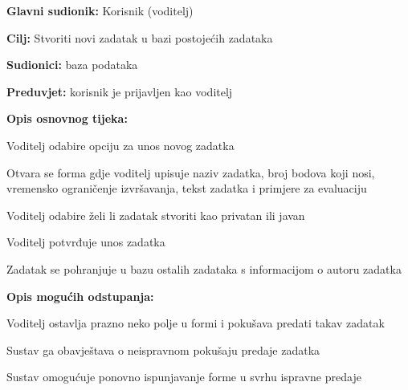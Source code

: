 										
										
					\noindent {}
					\begin{packed_item}
						
						\item \textbf{Glavni sudionik: }Korisnik (voditelj)
						\item \textbf{Cilj:} Stvoriti novi zadatak u bazi postojećih zadataka
						\item \textbf{Sudionici:} baza podataka
						\item \textbf{Preduvjet:} korisnik je prijavljen kao voditelj
						\item \textbf{Opis osnovnog tijeka:}
						
						\item[] \begin{packed_enum}
							\item Voditelj odabire opciju za unos novog zadatka
							\item Otvara se forma gdje voditelj upisuje naziv zadatka, broj bodova koji nosi, vremensko ograničenje izvršavanja, tekst zadatka i primjere za evaluaciju
							\item Voditelj odabire želi li zadatak stvoriti kao privatan ili javan
							\item Voditelj potvrđuje unos zadatka
							\item Zadatak se pohranjuje u bazu ostalih zadataka s informacijom o autoru zadatka
						\end{packed_enum}
						
						\item  \textbf{Opis mogućih odstupanja:}
						\item[] \begin{packed_item}
							
							\item[2.a] Voditelj ostavlja prazno neko polje u formi i pokušava predati takav zadatak
							\item[] \begin{packed_enum}
								
								\item Sustav ga obavještava o neispravnom pokušaju predaje zadatka 
								\item Sustav omogućuje ponovno ispunjavanje forme u svrhu ispravne predaje
								
							\end{packed_enum}
						\end{packed_item}
					\end{packed_item}
					
